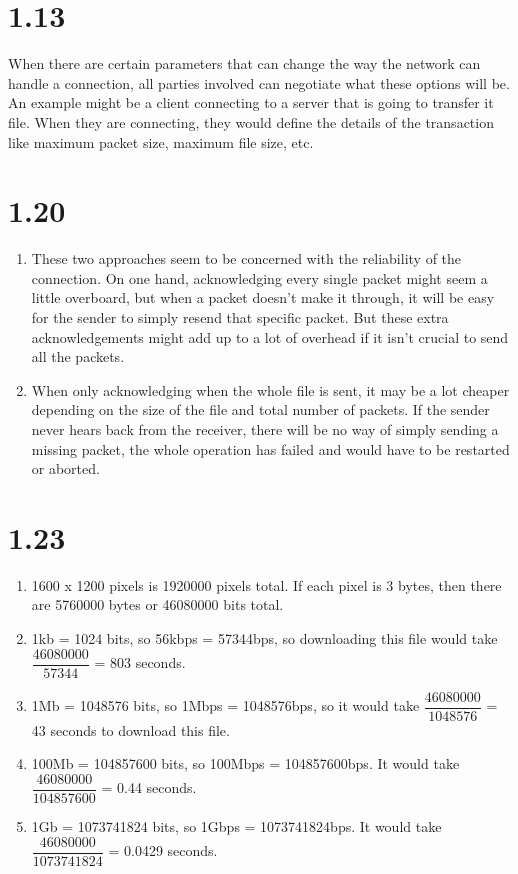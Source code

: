 \documentclass[a4paper,12pt]{article}
\begin{document}
\section*{1.13}
When there are certain parameters that can change the way the network
can handle a connection, all parties involved can negotiate what these
options will be. An example might be a client connecting to a server
that is going to transfer it file. When they are connecting, they
would define the details of the transaction like maximum packet size,
maximum file size, etc.

\section*{1.20}
\begin{enumerate}[]
  \item These two approaches seem to be concerned with the reliability
    of the connection. On one hand, acknowledging every single packet
    might seem a little overboard, but when a packet doesn't make it
    through, it will be easy for the sender to simply resend that
    specific packet. But these extra acknowledgements might add up to
    a lot of overhead if it isn't crucial to send all the packets.

  \item When only acknowledging when the whole file is sent, it may be
    a lot cheaper depending on the size of the file and total number
    of packets. If the sender never hears back from the receiver,
    there will be no way of simply sending a missing packet, the whole
    operation has failed and would have to be restarted or aborted.
\end{enumerate}

\section*{1.23} 

\begin{enumerate}[]  
  \item 1600 x 1200 pixels is 1920000 pixels total. If each pixel is
     3 bytes, then there are 5760000 bytes or 46080000 bits total.
  
  \item 1kb = 1024 bits, so 56kbps = 57344bps, so downloading this file
    would take $\dfrac{46080000}{57344}$ = 803 seconds.

  \item 1Mb = 1048576 bits, so 1Mbps = 1048576bps, so it would take
    $\dfrac{46080000}{1048576}$ = 43 seconds to download this file.
    
  \item 100Mb = 104857600 bits, so 100Mbps = 104857600bps. It would
    take $\dfrac{46080000}{104857600}$ = 0.44 seconds.
    
  \item 1Gb = 1073741824 bits, so 1Gbps = 1073741824bps. It would take
    $\dfrac{46080000}{1073741824}$ = 0.0429 seconds.
    
\end{enumerate}
\end{document}
